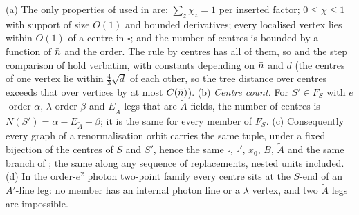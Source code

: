 \begin{lemma}\label{lem:a02:Lsharp}
\textup{(a)} The only properties of \cite[(3.36)]{K1} used in \cite[Sects.~3.4--3.5]{K1} are: $\sum_z\chi_z=1$ per inserted factor; $0\le\chi\le1$ with support of size $O(1)$ and bounded derivatives; every localised vertex lies within $O(1)$ of a centre in $\square$; and the number of centres is bounded by a function of $\bar n$ and the order. The rule by centres has all of them, so \cite[Thm.~3.5, Prop.~3.6, (3.40)--(3.42), (3.43)--(3.57), (3.68), (3.85)]{K1} and the step comparison of \cite[p.~665]{K1} hold verbatim, with constants depending on $\bar n$ and $d$ (the centres of one vertex lie within $\frac43\sqrt d$ of each other, so the tree distance over centres exceeds that over vertices by at most $C(\bar n)$). \textup{(b)} \emph{Centre count.} For $S'\in F_S$ with $e$-order $\alpha$, $\lambda$-order $\beta$ and $E_{\tilde A}$ legs that are $\tilde A$ fields, the number of centres is $N(S')=\alpha-E_{\tilde A}+\beta$; it is the same for every member of $F_S$. \textup{(c)} Consequently every graph of a renormalisation orbit carries the same tuple, under a fixed bijection of the centres of $S$ and $S'$, hence the same $\square$, $\square'$, $x_0$, $B$, $\tilde A$ and the same branch of \cite[(3.38)/(3.39)]{K1}; the same along any sequence of replacements, nested units included. \textup{(d)} In the order-$e^2$ photon two-point family every centre sits at the $S$-end of an $A'$-line leg: no member has an internal photon line or a $\lambda$ vertex, and two $\tilde A$ legs are impossible.
\end{lemma}
